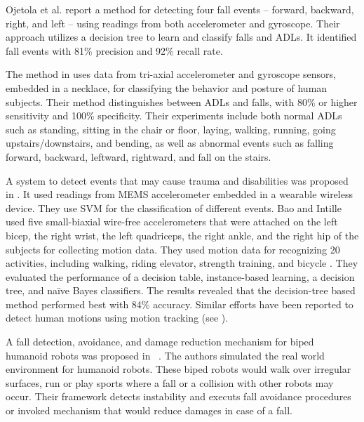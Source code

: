 \documentclass[]{IEEEtran}
\begin{document}
\par Ojetola et al. \cite{ojetolaFallDetection2011} report a method for detecting
four fall events -- forward, backward, right, and left -- using readings from both 
accelerometer and gyroscope. Their approach utilizes a decision tree to learn
and classify falls and ADLs. It identified fall events with 81\% precision and
92\% recall rate. 

The method  in\cite{baekFallDetection2013} uses  data from tri-axial
accelerometer  and  gyroscope  sensors, embedded in a necklace, for classifying
the  behavior  and  posture  of  human subjects. Their method distinguishes
between ADLs and  falls, with 80\%  or higher sensitivity  and  100\%
specificity. Their experiments include both normal ADLs such as standing,
sitting in the chair or floor, laying, walking, running, going
upstairs/downstairs, and bending, as well as abnormal events such as falling
forward, backward, leftward, rightward, and fall on the stairs. 
 
A system  to detect  events that may cause trauma and disabilities  was
proposed in \cite{leoneFallDetection2013}. It used readings from MEMS
accelerometer embedded in a wearable wireless device. They use SVM for
the classification of different events. Bao and Intille 
\cite{BaoActivityrecognition2004} used five small-biaxial wire-free accelerometers
that were attached  on the left bicep, the right wrist, the left quadriceps, the
right ankle, and the right hip  of the subjects for collecting motion data. They used motion data for 
recognizing 20 activities, including walking, riding elevator, strength training, and
bicycle . They evaluated the performance of a decision table,
instance-based learning, a decision tree, and na\"{i}ve Bayes classifiers. The results
revealed that the decision-tree based method performed best with 84\%
accuracy.  Similar efforts have been reported to detect human motions using
motion tracking (see
\cite{dumitracheFallDetection2013,kumarActivitAndFallDetection2013,krishnanActivityRecognition2014,gaoActivityRecognition2014,alvarezActivityAndFallRecognotion2015}).
 

A fall detection, avoidance, and damage reduction mechanism for biped humanoid
robots was proposed in {~\cite{Moya2015}}.  The authors
simulated the real world environment for humanoid robots. These biped robots would
walk over irregular surfaces, run or play sports where a fall or a collision with
other robots may occur. Their framework detects instability and executs fall
avoidance  procedures or invoked mechanism that would reduce damages in case
of a fall. %
\end{document}
